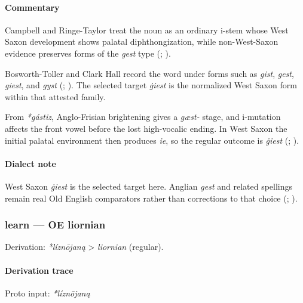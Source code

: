 \documentclass[
  british,
  a4paper,
]{article}
\begin{document}
\paragraph{Commentary}\label{commentary-6}

Campbell and Ringe-Taylor treat the noun as an ordinary i-stem whose
West Saxon development shows palatal diphthongization, while
non-West-Saxon evidence preserves forms of the \emph{gest} type
(;
).

Bosworth-Toller and Clark Hall record the word under forms such as
\emph{gist}, \emph{gest}, \emph{giest}, and \emph{gyst}
(;
). The selected target
\emph{ġiest} is the normalized West Saxon form within that attested
family.

From \emph{*gástiz}, Anglo-Frisian brightening gives a \emph{gæst-}
stage, and i-mutation affects the front vowel before the lost
high-vocalic ending. In West Saxon the initial palatal environment then
produces \emph{ie}, so the regular outcome is \emph{ġiest}
(;
).

\paragraph{Dialect note}\label{dialect-note-1}

West Saxon \emph{ġiest} is the selected target here. Anglian \emph{gest}
and related spellings remain real Old English comparators rather than
corrections to that choice (; ).

\subsubsection{learn --- OE liornian}\label{learn-oe-liornian-1}

Derivation: \emph{*líznōjaną} \textgreater{} \emph{liornian} (regular).

\paragraph{Derivation trace}\label{derivation-trace-19}

Proto input: \emph{*líznōjaną}
\end{document}
